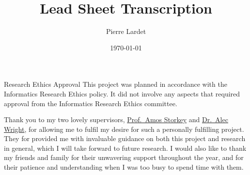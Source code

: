 \begin{preliminary}

    \title{Lead Sheet Transcription}
    
    \author{Pierre Lardet}
    
    
    
    
    
    \date{\today}
    
    
    \maketitle
    
    \newenvironment{ethics}
       {\begin{frontenv}{Research Ethics Approval}{\LARGE}}
       {\end{frontenv}\newpage}
    
    \begin{ethics}
    This project was planned in accordance with the Informatics Research
    Ethics policy. It did not involve any aspects that required approval
    from the Informatics Research Ethics committee.
    
    \standarddeclaration
    \end{ethics}
    
    
    \begin{acknowledgements}
    Thank you to my two lovely supervisors, \hyperlink{https://homepages.inf.ed.ac.uk/amos/index.html}{Prof.~Amos Storkey} and \hyperlink{https://www.acoustics.ed.ac.uk/people/dr-alec-wright/}{Dr.~Alec Wright}, for allowing me to fulfil my desire for such a personally fulfilling project. They for provided me with invaluable guidance on both this project and research in general, which I will take forward to future research. I would also like to thank my friends and family for their unwavering support throughout the year, and for their patience and understanding when I was too busy to spend time with them.
    \end{acknowledgements}
    
    
    \tableofcontents
    \end{preliminary}